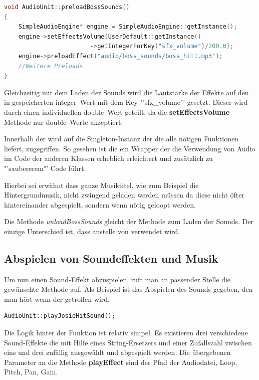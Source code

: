 \begin{lstlisting}[label=lst:preloadBossSounds,
				   language=C++,
				   firstnumber=30,
				   caption=BossLevel-Sounds laden ( AudioUnit.cpp )]
void AudioUnit::preloadBossSounds()
{
	SimpleAudioEngine* engine = SimpleAudioEngine::getInstance();
	engine->setEffectsVolume(UserDefault::getInstance()
						->getIntegerForKey("sfx_volume")/200.0);
	engine->preloadEffect("audio/boss_sounds/boss_hit1.mp3");
	//Weitere Preloads
}
\end{lstlisting}

Gleichzeitig mit dem Laden der Sounds wird die Lautstärke der Effekte auf den in  gespeicherten integer--Wert mit dem Key "'sfx\_volume"' gesetzt. Dieser wird durch einen individuellen double--Wert geteilt, da die \textbf{setEffectsVolume} Methode nur double--Werte akzeptiert.

Innerhalb der  wird auf die Singleton-Instanz der  die alle nötigen Funktionen liefert, zugegriffen. So gesehen ist die  ein Wrapper der die Verwendung von Audio im Code der anderen Klassen erheblich erleichtert und zusätzlich zu "'saubererem"' Code führt. 

Hierbei sei erwähnt dass ganze Musiktitel, wie zum Beispiel die Hintergrundmusik, nicht zwingend geladen werden müssen da diese nicht öfter hintereinander abgespielt, sondern wenn nötig geloopt werden. 

Die Methode \textit{unloadBossSounds} gleicht der Methode zum Laden der Sounds. Der einzige Unterschied ist, dass  anstelle von  verwendet wird.

\subsection{Abspielen von Soundeffekten und Musik} 
Um nun einen Sound-Effekt abzuspielen, ruft man an passender Stelle die gewünschte Methode auf. Als Beispiel ist das Abspielen des Sounds gegeben, den man hört wenn der  getroffen wird.

\begin{lstlisting}[style=singleline]
AudioUnit::playJosieHitSound();
\end{lstlisting}

Die Logik hinter der Funktion ist relativ simpel. Es existieren drei verschiedene Sound-Effekte die mit Hilfe eines String-Ersetzers und einer Zufallszahl zwischen eins und drei zufällig ausgewählt und abgespielt werden. Die übergebenen Parameter an die Methode \textbf{playEffect} sind der Pfad der Audiodatei, Loop, Pitch, Pan, Gain.

